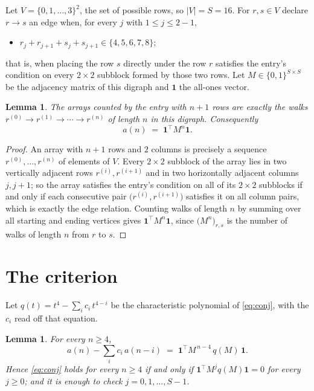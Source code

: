 \documentclass[11pt,a4paper]{article}
\theoremstyle{plain}
\newtheorem{lemma}[theorem]{Lemma}
\theoremstyle{definition}
\begin{document}
Let $V=\{0,1,\dots,3\}^{2}$, the set of possible rows, so $|V|=S=16$. For
$r,s\in V$ declare $r\to s$ an edge when, for every $j$ with $1\le j\le 2-1$,
\begin{itemize}
\item $r_j+r_{j+1}+s_j+s_{j+1}\in\{4, 5, 6, 7, 8\}$;

\end{itemize}
that is, when placing the row $s$ directly under the row $r$ satisfies the entry's
condition on every $2\times2$ subblock formed by those two rows. Let $M\in\{0,1\}^{S\times
S}$ be the adjacency matrix of this digraph and $\mathbf{1}$ the all-ones vector.

\begin{lemma}\label{lem:walk}
The arrays counted by the entry with $n+1$ rows are exactly the walks
$r^{(0)}\to r^{(1)}\to\cdots\to r^{(n)}$ of length $n$ in this digraph. Consequently
\[
a(n)\;=\;\mathbf{1}^{\!\top}M^{n}\mathbf{1} .
\]
\end{lemma}

\begin{proof}
An array with $n+1$ rows and $2$ columns is precisely a sequence
$r^{(0)},\dots,r^{(n)}$ of elements of $V$. Every $2\times2$ subblock of the array lies
in two vertically adjacent rows $r^{(i)},r^{(i+1)}$ and in two horizontally adjacent
columns $j,j+1$; so the array satisfies the entry's condition on all of its $2\times2$
subblocks if and only if each consecutive pair $\bigl(r^{(i)},r^{(i+1)}\bigr)$ satisfies
it on all column pairs, which is exactly the edge relation. Counting walks of length $n$ by
summing over all starting and ending vertices gives
$\mathbf{1}^{\!\top}M^{n}\mathbf{1}$, since
$\bigl(M^{n}\bigr)_{r,s}$ is the number of walks of length $n$ from $r$ to $s$.
\end{proof}

\section{The criterion}

Let $q(t)=t^{4}-\sum_{i}c_i\,t^{4-i}$ be the characteristic polynomial of
\eqref{eq:conj}, with the $c_i$ read off that equation.

\begin{lemma}\label{lem:crit}
For every $n\ge4$,
\[
a(n)-\sum_i c_i\,a(n-i)\;=\;\mathbf{1}^{\!\top}M^{\,n-4}\,q(M)\,\mathbf{1} .
\]
Hence \eqref{eq:conj} holds for every $n\ge4$ if and only if
$\mathbf{1}^{\!\top}M^{j}q(M)\mathbf{1}=0$ for every $j\ge0$; and it is enough to
check $j=0,1,\dots,S-1$.
\end{lemma}
\end{document}
